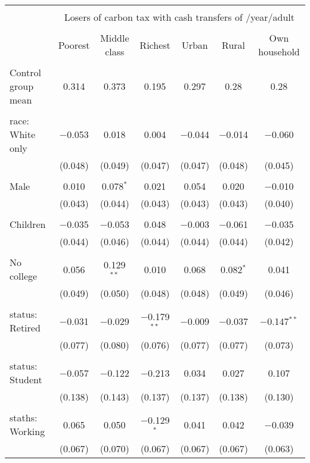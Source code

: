 
\begin{tabular}{@{\extracolsep{5pt}}lcccccc} 
\\[-1.8ex]\hline 
\hline \\[-1.8ex] 
 & \multicolumn{6}{c}{Losers of carbon tax with cash transfers of \textdollar 600/year/adult} \\ 
\cline{2-7} 
\\[-1.8ex] & Poorest & Middle class & Richest & Urban & Rural & Own household \\ 
\hline \\[-1.8ex] 
 Control group mean & 0.314 & 0.373 & 0.195 & 0.297 & 0.28 & 0.28  \\ \hline \\[-1.8ex] race: White only & $-$0.053 & 0.018 & 0.004 & $-$0.044 & $-$0.014 & $-$0.060 \\ 
  & (0.048) & (0.049) & (0.047) & (0.047) & (0.048) & (0.045) \\ 
  & & & & & & \\ 
 Male & 0.010 & 0.078$^{*}$ & 0.021 & 0.054 & 0.020 & $-$0.010 \\ 
  & (0.043) & (0.044) & (0.043) & (0.043) & (0.043) & (0.040) \\ 
  & & & & & & \\ 
 Children & $-$0.035 & $-$0.053 & 0.048 & $-$0.003 & $-$0.061 & $-$0.035 \\ 
  & (0.044) & (0.046) & (0.044) & (0.044) & (0.044) & (0.042) \\ 
  & & & & & & \\ 
 No college & 0.056 & 0.129$^{**}$ & 0.010 & 0.068 & 0.082$^{*}$ & 0.041 \\ 
  & (0.049) & (0.050) & (0.048) & (0.048) & (0.049) & (0.046) \\ 
  & & & & & & \\ 
 status: Retired & $-$0.031 & $-$0.029 & $-$0.179$^{**}$ & $-$0.009 & $-$0.037 & $-$0.147$^{**}$ \\ 
  & (0.077) & (0.080) & (0.076) & (0.077) & (0.077) & (0.073) \\ 
  & & & & & & \\ 
 status: Student & $-$0.057 & $-$0.122 & $-$0.213 & 0.034 & 0.027 & 0.107 \\ 
  & (0.138) & (0.143) & (0.137) & (0.137) & (0.138) & (0.130) \\ 
  & & & & & & \\ 
 staths: Working & 0.065 & 0.050 & $-$0.129$^{*}$ & 0.041 & 0.042 & $-$0.039 \\ 
  & (0.067) & (0.070) & (0.067) & (0.067) & (0.067) & (0.063) \\ 

\end{tabular}
